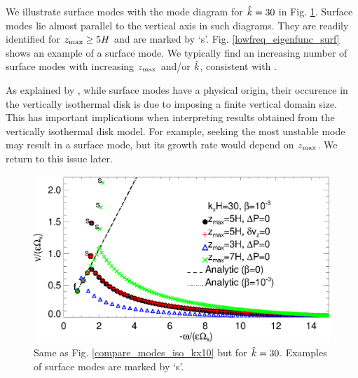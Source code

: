 We illustrate surface modes with the mode diagram for $\hat{k}=30$ in
Fig. \ref{compare_modes_iso_kx30}. Surface 
modes lie almost parallel to the vertical axis
in such diagrams. They are readily identified for  $z_\mathrm{max}\geq 5H$ and
are marked by `s'.  Fig. \ref{lowfreq_eigenfunc_surf} shows an example
of a surface mode. We typically find an increasing
number of surface modes with increasing $z_\mathrm{max}$ and/or $\hat{k}$,
consistent with \cite{barker15}. 
 
As explained by \cite{barker15}, while surface modes have a physical
origin, their occurence in the vertically isothermal disk is due to
imposing a finite vertical domain size. This has important
implications when interpreting results obtained from the vertically
isothermal disk model. For example, seeking the most unstable mode may
result in a surface mode, but its growth rate would depend on
$z_\mathrm{max}$. We return to this issue later.     


\begin{figure}
  \includegraphics[width=\linewidth]{figures/compare_modes_iso_kx30_analytic.ps}
  \caption{Same as Fig. \ref{compare_modes_iso_kx10} but for $\hat{k}=30$. Examples of surface modes are
    marked by `s'. \label{compare_modes_iso_kx30}
  }
\end{figure}


